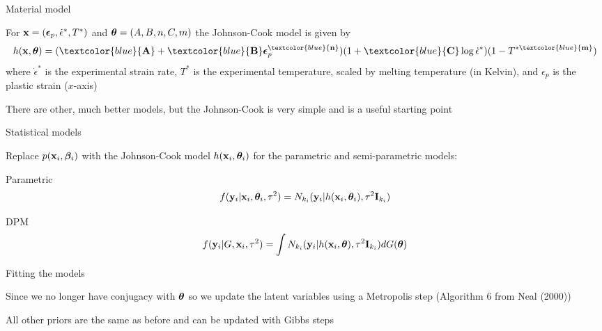 \documentclass[mathserif, 12pt, t]{beamer}
\newcommand{\bc}[1]{\textcolor{blue}{\mathbf{#1}}}
\begin{document}
\begin{frame}{Material model}

For $\mathbf{\bm{x}}=(\mathbf{\bm{\epsilon}}_p,\dot\epsilon^*,T^*)$ and $\mathbf{\bm{\theta}}=(A,B,n,C,m)$ the Johnson-Cook model is given by
\[ h(\m{x}, \m{\theta}) = (\bc{A} + \bc{B}\m{\epsilon}_p^{\bc{n}})(1 + \bc{C} \log \dot\epsilon^*)(1 - T^{*\bc{m}}) \]
where $\dot\epsilon^*$ is the experimental strain rate, $T^*$ is the experimental temperature, scaled by melting temperature (in Kelvin), and $\epsilon_p$ is the plastic strain ($x$-axis)
\bigskip

There are other, much better models, but the Johnson-Cook is very simple and is a useful starting point

\end{frame}

\begin{frame}{Statistical models}

Replace $p(\mathbf{\bm{x}}_i, \mathbf{\bm{\beta}}_i)$ with the Johnson-Cook model $h(\mathbf{\bm{x}}_i, \mathbf{\bm{\theta}}_i)$ for the parametric and semi-parametric models:
\bigskip

Parametric
\[ f(\mathbf{\bm{y}}_i|\mathbf{\bm{x}}_i,\mathbf{\bm{\theta}}_i,\tau^2) = N_{k_i}(\mathbf{\bm{y}}_i|h(\mathbf{\bm{x}}_i, \mathbf{\bm{\theta}}_i), \tau^2\mathbf{\bm{I}}_{k_i}) \]

DPM
\[ f(\mathbf{\bm{y}}_i|G,\mathbf{\bm{x}}_i, \tau^2) = \int N_{k_i}(\mathbf{\bm{y}}_i|h(\mathbf{\bm{x}}_i, \mathbf{\bm{\theta}}), \tau^2\mathbf{\bm{I}}_{k_i})dG(\mathbf{\bm{\theta}}) \]

\end{frame}

\begin{frame}{Fitting the models}

Since we no longer have conjugacy with $\mathbf{\bm{\theta}}$ so we update the latent variables using a Metropolis step (Algorithm 6 from Neal (2000))
\bigskip

All other priors are the same as before and can be updated with Gibbs steps

\end{frame}
\end{document}
